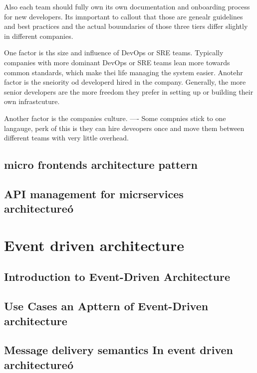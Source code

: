 \documentclass[a4paper, 11pt]{book}
\begin{document}
    Also each team should fully own its own documentation and onboarding process for new developers.
    Its imnportant to callout that those are genealr guidelines and best practices and the actual bouundaries of those three tiers differ slightly in different companies.

    One factor is ths size and influence of DevOps or SRE teams.
    Typically companies with more dominant DevOps or SRE teams lean more towards common standards, which make thei life managing the system easier.
    Anotehr factor is the sneiority od developerd hired in the company.
    Generally, the more senior developers are the more freedom they prefer in setting up or building their own infrastcuture.

    Another factor is the companies culture.
    ---- Some compnies stick to one langauge, perk of this is they can hire deveopers once and move them between different teams with very little overhead.


    \subsection{micro frontends architecture pattern}

    \subsection{API management for micrservices architectureó}


    \section{Event driven architecture}

    \subsection{Introduction to Event-Driven Architecture}

    \subsection{Use Cases an Apttern of Event-Driven architecture}

    \subsection{Message delivery semantics In event driven architectureó}
\end{document}
